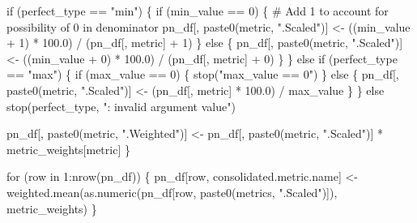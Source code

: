 \documentclass[]{article}
\newenvironment{Shaded}{\begin{snugshade}}{\end{snugshade}}
\newcommand{\KeywordTok}[1]{\textcolor[rgb]{0.94,0.87,0.69}{{#1}}}
\newcommand{\DecValTok}[1]{\textcolor[rgb]{0.86,0.86,0.80}{{#1}}}
\newcommand{\FloatTok}[1]{\textcolor[rgb]{0.75,0.75,0.82}{{#1}}}
\newcommand{\StringTok}[1]{\textcolor[rgb]{0.80,0.58,0.58}{{#1}}}
\newcommand{\CommentTok}[1]{\textcolor[rgb]{0.50,0.62,0.50}{{#1}}}
\newcommand{\NormalTok}[1]{\textcolor[rgb]{0.80,0.80,0.80}{{#1}}}
\begin{document}
\begin{Shaded}
\begin{Highlighting}[]
                \NormalTok{if (perfect_type ==}\StringTok{ "min"}\NormalTok{) \{}
            \NormalTok{if (min_value ==}\StringTok{ }\DecValTok{0}\NormalTok{) \{}
                \CommentTok{# Add 1 to account for possibility of 0 in denominator}
                \NormalTok{pn_df[, }\KeywordTok{paste0}\NormalTok{(metric, }\StringTok{".Scaled"}\NormalTok{)] <-}\StringTok{ }
\StringTok{                    }\NormalTok{((min_value +}\StringTok{ }\DecValTok{1}\NormalTok{) *}\StringTok{ }\FloatTok{100.0}\NormalTok{) /}\StringTok{ }\NormalTok{(pn_df[, metric] +}\StringTok{ }\DecValTok{1}\NormalTok{)}
            \NormalTok{\} else \{}
                \NormalTok{pn_df[, }\KeywordTok{paste0}\NormalTok{(metric, }\StringTok{".Scaled"}\NormalTok{)] <-}\StringTok{ }
\StringTok{                    }\NormalTok{((min_value +}\StringTok{ }\DecValTok{0}\NormalTok{) *}\StringTok{ }\FloatTok{100.0}\NormalTok{) /}\StringTok{ }\NormalTok{(pn_df[, metric] +}\StringTok{ }\DecValTok{0}\NormalTok{)}
            \NormalTok{\}}
        \NormalTok{\} else if (perfect_type ==}\StringTok{ "max"}\NormalTok{) \{}
            \NormalTok{if (max_value ==}\StringTok{ }\DecValTok{0}\NormalTok{) \{}
                \KeywordTok{stop}\NormalTok{(}\StringTok{"max_value == 0"}\NormalTok{)}
            \NormalTok{\} else \{    }
                \NormalTok{pn_df[, }\KeywordTok{paste0}\NormalTok{(metric, }\StringTok{".Scaled"}\NormalTok{)] <-}\StringTok{ }
\StringTok{                    }\NormalTok{(pn_df[, metric] *}\StringTok{ }\FloatTok{100.0}\NormalTok{) /}\StringTok{ }\NormalTok{max_value}
            \NormalTok{\}    }
        \NormalTok{\} else }\KeywordTok{stop}\NormalTok{(perfect_type, }\StringTok{": invalid argument value"}\NormalTok{)}
        
        \NormalTok{pn_df[, }\KeywordTok{paste0}\NormalTok{(metric, }\StringTok{".Weighted"}\NormalTok{)] <-}\StringTok{ }
\StringTok{            }\NormalTok{pn_df[, }\KeywordTok{paste0}\NormalTok{(metric, }\StringTok{".Scaled"}\NormalTok{)] *}\StringTok{ }\NormalTok{metric_weights[metric]}
    \NormalTok{\}}
    
    \NormalTok{for (row in }\DecValTok{1}\NormalTok{:}\KeywordTok{nrow}\NormalTok{(pn_df)) \{}
        \NormalTok{pn_df[row, consolidated.metric.name] <-}\StringTok{ }
\StringTok{            }\KeywordTok{weighted.mean}\NormalTok{(}\KeywordTok{as.numeric}\NormalTok{(pn_df[row, }\KeywordTok{paste0}\NormalTok{(metrics, }\StringTok{".Scaled"}\NormalTok{)]),}
                          \NormalTok{metric_weights)}
    \NormalTok{\}    }


\end{Highlighting}
\end{Shaded}
\end{document}
